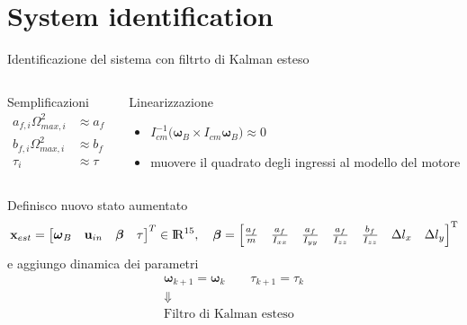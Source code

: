 \documentclass[]{beamer}
\begin{document}
	\section{System identification}
	
	\begin{frame}{Identificazione del sistema con filtrto di Kalman esteso}
		\centering
		\begin{columns}
			\begin{column}{.4\textwidth}
				\centering
				\begin{block}{Semplificazioni}
					\setlength\abovedisplayskip{-10pt}
					\begin{align*}
						a_{f,i}\Omega_{max,i}^2 &\approx a_f \\
						b_{f,i}\Omega_{max,i}^2 &\approx b_f \\
						\tau_i &\approx \tau
					\end{align*}
				\end{block}
			\end{column}
			\begin{column}{.6\textwidth}
				\centering
				\begin{block}{Linearizzazione}
					\begin{itemize}
						\item $I_{cm}^{-1}\bigl(\boldsymbol{\omega}_B \times I_{cm} \boldsymbol{\omega}_B \bigl) \approx 0$
						\item muovere il quadrato degli ingressi al modello del motore
					\end{itemize}
				\end{block}
			\end{column}
		\end{columns}
		\centering
		Definisco nuovo stato aumentato
		\tiny
		\begin{equation*}
			\mathbf{x}_{est}=
			\begin{bmatrix}
				\boldsymbol{\omega}_B & \mathbf{u}_{in} & \boldsymbol{\beta} & \tau
			\end{bmatrix}^T
			\in \rm I\!R^{15}, \quad \boldsymbol{\beta}=
			\begin{bmatrix}
				\frac{a_f}{m} & \frac{a_f}{I_{xx}} & \frac{a_f}{I_{yy}} & \frac{a_f}{I_{zz}} & \frac{b_f}{I_{zz}} & \Delta l_x & \Delta l_y 
			\end{bmatrix}^T
		\end{equation*}
		\normalsize
		e aggiungo dinamica dei parametri
		\begin{gather*}
			\boldsymbol{\omega}_{k+1} = \boldsymbol{\omega}_k \qquad \tau_{k+1} = \tau_{k} \\
			\Downarrow \\
			\text{Filtro di Kalman esteso}
		\end{gather*}
	\end{frame}
	
\end{document}

